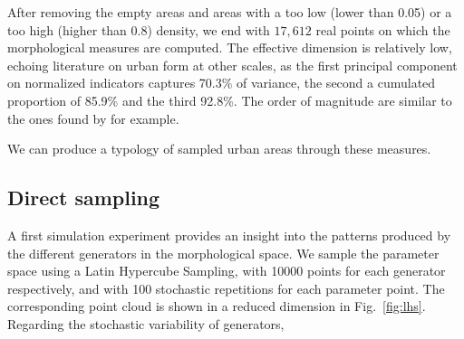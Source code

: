 \documentclass[letterpaper]{article}
\begin{document}
After removing the empty areas and areas with a too low (lower than 0.05) or a too high (higher than 0.8) density, we end with $17,612$ real points on which the morphological measures are computed. The effective dimension is relatively low, echoing literature on urban form at other scales, as the first principal component on normalized indicators captures 70.3\% of variance, the second a cumulated proportion of 85.9\% and the third 92.8\%. The order of magnitude are similar to the ones found by \cite{Schwarz201029} for example.


We can produce a typology of sampled urban areas through these measures.






\subsection{Direct sampling}

A first simulation experiment provides an insight into the patterns produced by the different generators in the morphological space. We sample the parameter space using a Latin Hypercube Sampling, with 10000 points for each generator respectively, and with 100 stochastic repetitions for each parameter point. The corresponding point cloud is shown in a reduced dimension in Fig.~\ref{fig:lhs}.
Regarding the stochastic variability of generators, %
\end{document}
